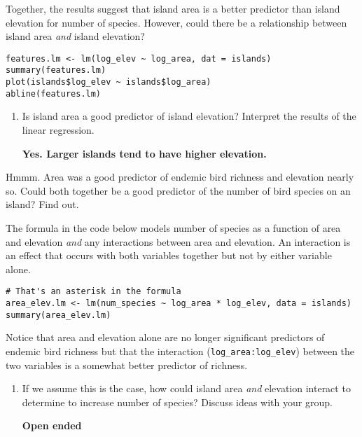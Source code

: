 \documentclass[11pt]{article}
\newcommand{\bigSpace}{\vspace{4\baselineskip}}
\begin{document}
Together, the results suggest that island area is a better predictor than island elevation for number of species. However, could there be a relationship between island area \emph{and} island elevation?

\begin{verbatim}
features.lm <- lm(log_elev ~ log_area, dat = islands)
summary(features.lm)
plot(islands$log_elev ~ islands$log_area)
abline(features.lm)
\end{verbatim}

\begin{enumerate}[resume]
\item Is island area a good predictor of island elevation? Interpret the results of the linear regression.

\textbf{Yes. Larger islands tend to have higher elevation.}

\vspace{2\baselineskip}

\end{enumerate}

Hmmm. Area was a good predictor of endemic bird richness and elevation nearly so. Could both together be a good predictor of the number of bird species on an island? Find out.

The formula in the code below models number of species as a function of area and elevation \emph{and} any interactions between area and elevation. An interaction is an effect that occurs with  both variables together but not by either variable alone.

\begin{verbatim}
# That's an asterisk in the formula
area_elev.lm <- lm(num_species ~ log_area * log_elev, data = islands)
summary(area_elev.lm)
\end{verbatim}

Notice that area and elevation alone are no longer significant predictors of endemic bird richness but that the interaction (\texttt{log\_area:log\_elev}) between the two variables is a somewhat better predictor of richness.


\begin{enumerate}[resume]
\item If we assume this is the case, how could island area \emph{and} elevation interact to determine to increase number of species? Discuss ideas with your group.

\textbf{Open ended} \bigSpace 

\end{enumerate}
\end{document}
